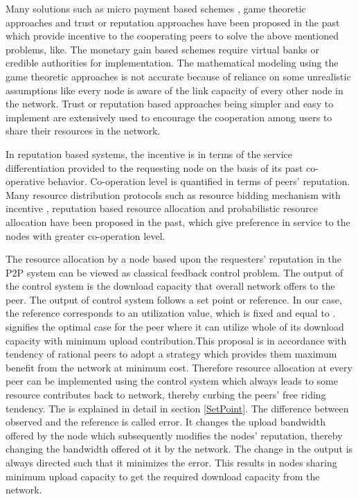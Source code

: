 \documentclass[journal]{IEEEtran}
\begin{document}
Many solutions such as  micro payment based schemes \cite{karma} \cite{bitcoin}, game theoretic approaches  \cite{Feldman}\cite{MaKiGame}\cite{Huiye} and trust or reputation approaches \cite{TrustEstimation}\cite{Satsiou}\cite{Eigen_Trust}\cite{Peer_Trust}\cite{Power_Trust}\cite{Gossip_Trust} have been proposed in the past which provide incentive to the cooperating peers to solve the above mentioned problems, like. The monetary gain based schemes require   virtual banks or credible authorities for implementation. The mathematical modeling using the game theoretic approaches is  not accurate \cite{Satsiou} because of reliance on some unrealistic assumptions like every node is aware of the link capacity of every other node in the network. Trust or reputation based approaches being simpler and easy to implement are extensively used to encourage the cooperation among users to share their resources in the network. 

In reputation based systems, the incentive is in terms of the service differentiation provided to the requesting node on the basis of its past co-operative behavior. Co-operation level is quantified in terms of peers' reputation. Many resource distribution protocols such as resource bidding mechanism with incentive \cite{MaKiGame}, reputation based resource allocation \cite{Satsiou} and probabilistic resource allocation \cite{probabilistic_allocation} have been proposed in the past, which give preference in service  to the nodes with greater co-operation level. 

The resource allocation by a node based upon the requesters' reputation in the P2P system can be viewed as classical feedback control problem. The output of the control system is the download capacity that overall network offers to the peer. The output of control system follows a set point or reference. In our case, the reference corresponds to an utilization value, which is fixed and equal to .  signifies the optimal case for the peer where it can utilize whole of its download capacity with minimum upload contribution.This proposal is in accordance with tendency of rational peers  \cite{Meo} to adopt a strategy which provides them maximum benefit from the network at minimum cost. Therefore resource allocation at every peer can be implemented using the  control system which always leads to some resource contributes back to network, thereby curbing the peers' free riding tendency. The  is explained in detail in section \ref{SetPoint}. The difference between observed  and the reference is called error. It changes the upload bandwidth offered by the node which subsequently modifies the nodes' reputation, thereby changing the bandwidth offered ot it by the network. The change in the output is always directed such that it minimizes the error. This results in nodes sharing minimum upload capacity to get the required download capacity from the network. 
\end{document}
